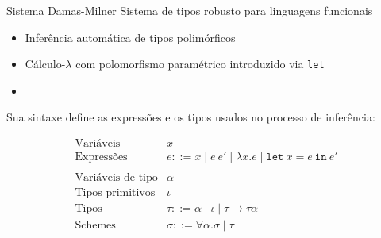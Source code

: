 \begin{frame}{Sistema Damas-Milner}
    Sistema de tipos robusto para linguagens funcionais~\cite{MILNER1978, DAMAS1982}
    \begin{itemize}
        \item Inferência automática de tipos polimórficos
        \item Cálculo-$\lambda$ com polomorfismo paramétrico introduzido via \texttt{let}
        \item[]
    \end{itemize}

    Sua sintaxe define as expressões e os tipos usados no processo de inferência:

    \begin{equation*}\label{eq:dm-syntax}
        \begin{array}{ll}
            \text{Variáveis}         & x                                                                                 \\
            \text{Expressões}        & e ::= x \mid e \ e' \mid \lambda x.e \mid \texttt{let} \ x = e \ \texttt{in} \ e' \\
            \\
            \text{Variáveis de tipo} & \alpha                                                                            \\
            \text{Tipos primitivos}  & \iota                                                                             \\
            \text{Tipos}             & \tau ::= \alpha \mid \iota \mid \tau \rightarrow \tau
            \alpha                                                                                                       \\
            \text{Schemes}           & \sigma ::= \forall \alpha. \sigma \mid \tau                                       \\
        \end{array}
    \end{equation*}
\end{frame}

